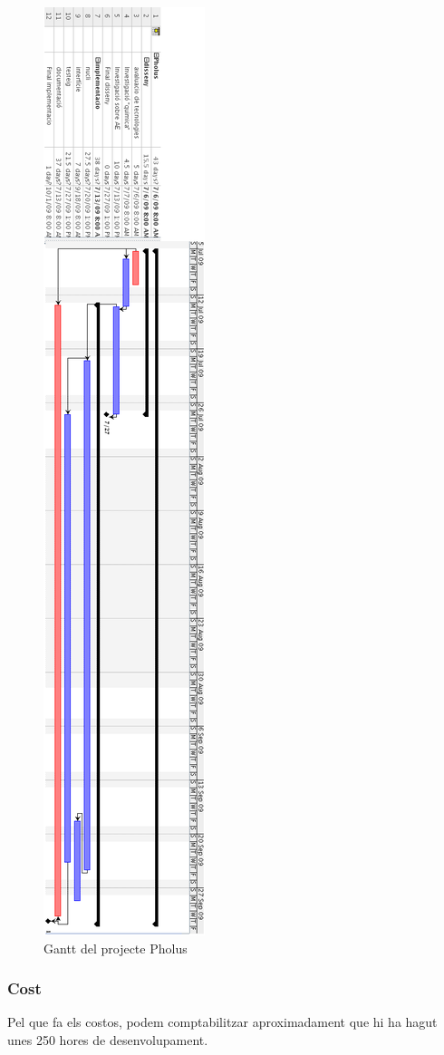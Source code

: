 \begin{figure}[h]
	\begin{center}
		\includegraphics[scale=0.39]{pholus/pholus-gantt.png}
	\end{center}
	\caption{Gantt del projecte Pholus}
	\label{fig:pholus-gantt}
\end{figure}

\subsubsection{Cost} %
\label{ssub:Cost}

Pel que fa els costos, podem comptabilitzar aproximadament que hi ha hagut unes
250 hores de desenvolupament.

%
